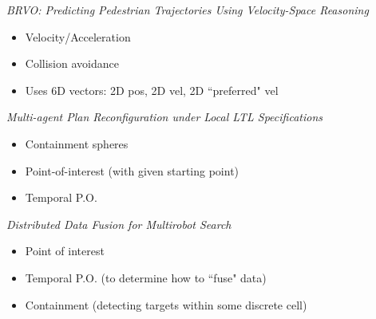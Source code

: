 \documentclass[12pt]{article}
\begin{document}
{\sl BRVO: Predicting Pedestrian Trajectories Using
Velocity-Space Reasoning}
\cite{kim2014brvo}
\begin{itemize}
  \item Velocity/Acceleration
  \item Collision avoidance
  \item Uses 6D vectors: 2D pos, 2D vel, 2D ``preferred" vel
\end{itemize}

{\sl Multi-agent Plan Reconfiguration under Local
LTL Specifications}
\cite{guo2014multi}
\begin{itemize}
  \item Containment spheres
  \item Point-of-interest (with given starting point)
  \item Temporal P.O.
\end{itemize}

{\sl Distributed Data Fusion for Multirobot Search}
\cite{hollingerdistributed}
\begin{itemize}
  \item Point of interest
  \item Temporal P.O. (to determine how to ``fuse" data)
  \item Containment (detecting targets within some 
                     discrete cell)
\end{itemize}



\end{document}
